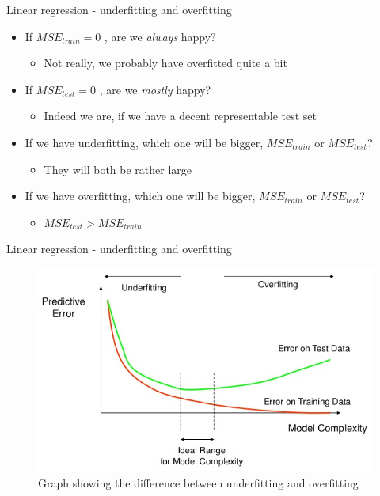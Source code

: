 \documentclass[aspectratio=169]{beamer}
\begin{document}
\begin{frame}{Linear regression - underfitting and overfitting}
    \begin{itemize}[<+->]
        \item If $MSE_{train} = 0$ , are we \textit{always} happy?
            \begin{itemize}
                \item Not really, we probably have overfitted quite a bit
            \end{itemize}
        \item If $MSE_{test} = 0$ , are we \textit{mostly} happy?
            \begin{itemize}
                \item Indeed we are, if we have a decent representable test set
            \end{itemize}
        \item If we have underfitting, which one will be bigger, $MSE_{train}$ or $MSE_{test}$?
            \begin{itemize}
                \item They will both be rather large
            \end{itemize}
        \item If we have overfitting, which one will be bigger, $MSE_{train}$ or $MSE_{test}$?
            \begin{itemize}
                \item $MSE_{test} > MSE_{train}$
            \end{itemize}
    \end{itemize}
\end{frame}
\begin{frame}{Linear regression - underfitting and overfitting}
    \begin{center}
        \begin{figure}
            \includegraphics[scale=0.46]{./images/underoverfitGraph.jpg}
            \caption{Graph showing the difference between underfitting and overfitting}
        \end{figure}
    \end{center}
\end{frame}
\end{document}
